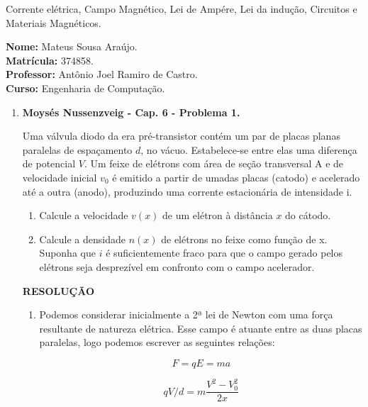 \documentclass[11pt,a4paper]{article}
\begin{document}
	\begin{center}
		\Large Corrente elétrica, Campo Magnético, Lei de Ampére, Lei da indução, Circuitos e Materiais Magnéticos. 
	\end{center}

\begin{flushleft}
\textbf{Nome:} Mateus Sousa Araújo. \\
\textbf{Matrícula:} 374858. \\
\textbf{Professor:} Antônio Joel Ramiro de Castro. \\
\textbf{Curso:} Engenharia de Computação. \\
\end{flushleft}

\begin{enumerate}

\item \textbf{Moysés Nussenzveig - Cap. 6 - Problema 1.}

Uma válvula diodo da era pré-transistor contém um par de placas planas paralelas de espaçamento $d$, no vácuo. Estabelece-se entre elas uma diferença de potencial $V$. Um feixe de elétrons com área de seção transversal A e de velocidade inicial $v_0$ é emitido a partir de umadas placas (catodo) e acelerado até a outra (anodo), produzindo uma corrente estacionária de intensidade i. 

\begin{enumerate}

\item Calcule a velocidade $v(x)$ de um elétron à distância $x$ do cátodo.
\item Calcule a densidade $n(x)$ de elétrons no feixe como função de x. Suponha que $i$ é suficientemente fraco para que o campo gerado pelos elétrons seja desprezível em confronto com o campo acelerador.
\end{enumerate}

\textbf{RESOLUÇÃO}

\begin{enumerate}

\item 

Podemos considerar inicialmente a 2ª lei de Newton com uma força resultante de natureza elétrica. Esse campo é atuante entre as duas placas paralelas, logo podemos escrever as seguintes relações:

$$F = q E = m a$$ 

$$q V/d = m \displaystyle\dfrac{V^2 - V_0^2}{2x}$$ 


\end{enumerate}
\end{enumerate}
\end{document}
